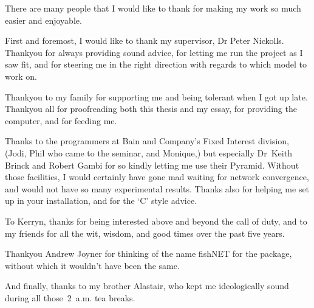 There are many people that I would like to thank for making my work so
much easier and enjoyable.

First and foremost, I would like to thank my supervisor, Dr Peter Nickolls.
Thankyou for always
providing sound advice, for letting me run the project
as I saw fit, and for steering me in the right direction with regards
to which model to work on.

Thankyou to my family for supporting me and being tolerant when
I got up late.
Thankyou all for proofreading both this thesis and my essay, 
for providing the computer, and for feeding me.

Thanks to the programmers at Bain and Company's Fixed Interest
division, (Jodi, Phil who came
to the seminar, and Monique,) but especially 
Dr~Keith Brinck and Robert Gambi for so kindly letting me use their
Pyramid.
Without those facilities, I would certainly have gone mad
waiting for network convergence, and would not have so many
experimental results.
Thanks also for helping me set up in your installation, and for the `C'
style advice.

To Kerryn, thanks for being interested above and beyond the call of
duty, and to my friends for all the wit, wisdom, and good times
over the past five years.

Thankyou Andrew Joyner for thinking of the name fishNET for the package,
without which it wouldn't have been the same.

And finally, thanks to my brother Alastair, who kept me ideologically sound
during all those~2~a.m. tea breaks.

